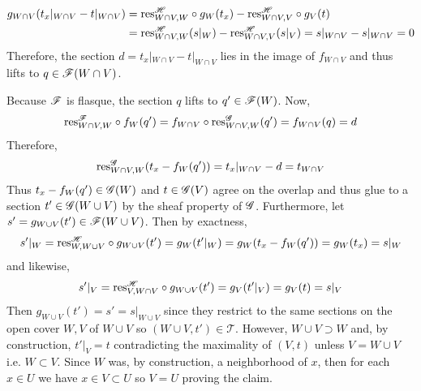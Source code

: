 \documentclass[12pt]{article}
\begin{document}
\begin{enumerate}
\begin{align*}
g_{W \cap V}(t_x|_{W \cap V} - t|_{W \cap V}) & =  \mathrm{res}^{\mathscr{H}}_{W \cap V, W} \circ g_{W}(t_x) - \mathrm{res}^{\mathscr{H}}_{W \cap V, V} \circ g_V(t)
\\
& = \mathrm{res}^{\mathscr{H}}_{W \cap V, W}(s |_{W}) - \mathrm{res}^{\mathscr{H}}_{W \cap V, V}(s|_V) =  s|_{W\cap V} - s|_{W \cap V} = 0
\end{align*}
Therefore, the section $d = t_x|_{W \cap V} - t|_{W \cap V}$ lies in the image of $f_{W \cap V}$ and thus lifts to $q \in \mathscr{F}(W \cap V)$. 
\begin{center}
\end{center}
Because $\mathscr{F}$ is flasque, the section $q$ lifts to $q' \in \mathscr{F}(W)$. Now, \[ \mathrm{res}^{\mathscr{F}}_{W \cap V, W} \circ f_W(q') = f_{W \cap V} \circ \mathrm{res}^{\mathscr{G}}_{W \cap V, W}(q') = f_{W \cap V}(q) = d \]
Therefore, 
\[ \mathrm{res}^{\mathscr{G}}_{W\cap V, W} (t_x - f_W(q')) = t_x |_{W \cap V} - d = t_{W \cap V} \]
Thus $t_x - f_W(q') \in \mathscr{G}(W)$ and $t \in \mathscr{G}(V)$ agree on the overlap and thus glue to a section $t' \in \mathscr{G}(W \cup V)$ by the sheaf property of $\mathscr{G}$. Furthermore, let $s' = g_{W \cup V}(t') \in \mathscr{F}(W \cup V)$. Then by exactness,
\[ s'|_W = \mathrm{res}^{\mathscr{H}}_{W, W \cup V} \circ g_{W \cup V}(t') = g_W(t'|_W) = g_W(t_x - f_W(q')) = g_W(t_x) = s|_W \]
and likewise,
\[ s'|_V = \mathrm{res}^{\mathscr{H}}_{V, W \cap V} \circ g_{W \cup V}(t') = g_V(t'|_V) = g_V(t) = s|_V \]
Then $g_{W \cup V}(t') = s' = s|_{W \cup V}$ since they restrict to the same sections on the open cover $W, V$ of $W \cup V$ so $(W \cup V, t') \in \mathcal{T}$. However, $W \cup V \supset W$ and, by construction, $t'|_V = t$  contradicting the maximality of $(V, t)$ unless $V = W \cup V$ i.e. $W \subset V$. Since $W$ was, by construction, a neighborhood of $x$, then for each $x \in U$ we have $x \in V \subset U$ so $V = U$ proving the claim.



\end{enumerate}
\end{document}
